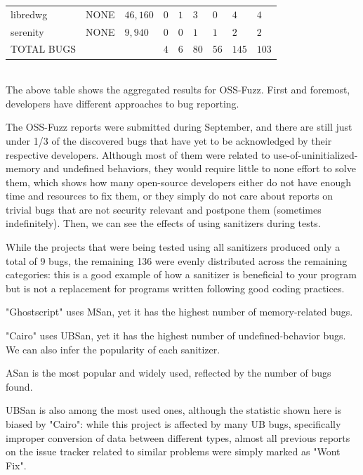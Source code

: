 \begin{adjustbox}{width=\textwidth,center}
\begin{tabular}{|l|l|l|l|l|l|l|l|l|}
libredwg         & NONE                & $46,160$            & $0$              & $1$           & $3$           & $0$            & $4$             & $4$                 \\
serenity         & NONE                & $9,940$             & $0$              & $0$           & $1$           & $1$            & $2$             & $2$                 \\
\hline
TOTAL BUGS   &   &   &$4$   &$6$   &$80$   &$56$   &$145$   &$103$       \\
\hline
\end{tabular}
\end{adjustbox}{}
\ \\ 

The above table shows the aggregated results for OSS-Fuzz.
First and foremost, developers have different approaches to bug reporting. 

The OSS-Fuzz reports were submitted during September, and there are still just under 1/3 of the discovered bugs that have yet to be acknowledged by their respective developers. Although most of them were related to use-of-uninitialized-memory and undefined behaviors, they would require little to none effort to solve them, which shows how many open-source developers either do not have enough time and resources to fix them, or they simply do not care about reports on trivial bugs that are not security relevant and postpone them (sometimes indefinitely).
Then, we can see the effects of using sanitizers during tests.

While the projects that were being tested using all sanitizers produced only a total of 9 bugs, the remaining 136 were evenly distributed across the remaining categories: this is a good example of how a sanitizer is beneficial to your program but is not a replacement for programs written following good coding practices.

"Ghostscript" uses MSan, yet it has the highest number of memory-related bugs.

"Cairo" uses UBSan, yet it has the highest number of undefined-behavior bugs.
We can also infer the popularity of each sanitizer.

ASan is the most popular and widely used, reflected by the number of bugs found.

UBSan is also among the most used ones, although the statistic shown here is biased by "Cairo": while this project is affected by many UB bugs, specifically improper conversion of data between different types, almost all previous reports on the issue tracker related to similar problems were simply marked as "Wont Fix".

